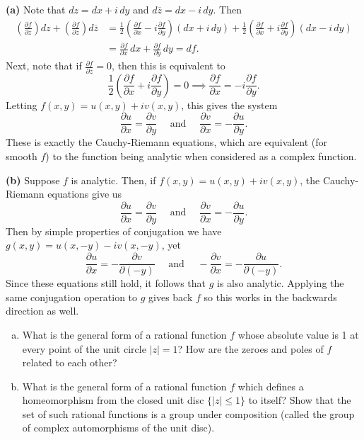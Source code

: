 \documentclass[11pt,letterpaper]{article}
\begin{document}
\begin{solution}
    \textbf{(a)} Note that $dz=dx+i\,dy$ and $d\overline{z} = dx-i\,dy$. Then
    \[
        \begin{aligned}
            \left(\frac{\partial f}{\partial z}\right)dz + \left(\frac{\partial f}{\partial \overline{z}}\right)d\overline{z} &= \frac{1}{2}\left(\frac{\partial f}{\partial x} - i\frac{\partial f}{\partial y}\right)(dx+i\,dy)+\frac{1}{2}\left(\frac{\partial f}{\partial x} + i\frac{\partial f}{\partial y}\right)(dx-i\,dy)\\
            &=\frac{\partial f}{\partial x}\,dx+\frac{\partial f}{\partial y}\, dy = df.
        \end{aligned}
    \] 
    Next, note that if $\frac{\partial f}{\partial \overline{z}}=0$, then this is equivalent to 
    \[
        \frac{1}{2}\left(\frac{\partial f}{\partial x}+i\frac{\partial f}{\partial y}\right)=0\implies \frac{\partial f}{\partial x}=-i\frac{\partial f}{\partial y}
    .\] 
    Letting $f(x,y)=u(x,y)+iv(x,y)$, this gives the system
    \[
        \frac{\partial u}{\partial x} = \frac{\partial v}{\partial y}\quad\textrm{ and }\quad \frac{\partial v}{\partial x} = -\frac{\partial u}{\partial y}
    .\]  
    These is exactly the Cauchy-Riemann equations, which are equivalent (for smooth $f$) to the function being analytic when considered as a complex function.
    
    \textbf{(b)} Suppose $f$ is analytic. Then, if $f(x,y)=u(x,y)+iv(x,y)$, the Cauchy-Riemann equations give us
    \[
        \frac{\partial u}{\partial x} = \frac{\partial v}{\partial y}\quad\textrm{ and }\quad \frac{\partial v}{\partial x} = -\frac{\partial u}{\partial y}
    .\] 
    Then by simple properties of conjugation we have $g(x,y)=u(x,-y)-iv(x,-y)$, yet
    \[
        \frac{\partial u}{\partial x} = -\frac{\partial v}{\partial (-y)}\quad\textrm{ and }\quad -\frac{\partial v}{\partial x} = -\frac{\partial u}{\partial (-y)}
    .\]  
    Since these equations still hold, it follows that $g$ is also analytic. Applying the same conjugation operation to $g$ gives back $f$ so this works in the backwards direction as well. 
\end{solution}

\begin{problem}\noindent
    \begin{enumerate}[(a)]
        \item What is the general form of a rational function $f$ whose absolute value is 1 at every point of the unit circle $|z|=1$? How are the zeroes and poles of $f$ related to each other? 
        \item What is the general form of a rational function $f$ which defines a homeomorphism from the closed unit disc $\{|z|\leq 1\}$ to itself?  Show that the set of such rational functions is a group under composition (called the group of complex automorphisms of the unit disc).
    \end{enumerate}
\end{problem}
\end{document}
